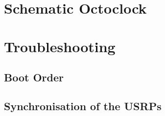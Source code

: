 \chapter{Schematic Octoclock}
\label{ch:HWSchOctoClock}





\chapter{Troubleshooting}\label{ch:troubleshooting}
\section{Boot Order} \label{sec:BootOrder}
\section{Synchronisation of the USRPs} \label{sec:USRPSync}

